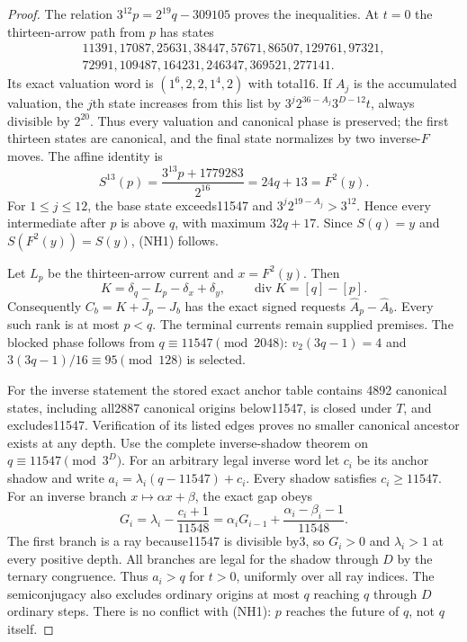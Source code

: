 \documentclass[11pt]{article}
\begin{document}
\begin{proof}
The relation $3^{12}p=2^{19}q-309105$ proves the inequalities.
At $t=0$ the thirteen-arrow path from $p$ has states
\[
\begin{gathered}
11391,17087,25631,38447,57671,86507,129761,97321,\\
72991,109487,164231,246347,369521,277141.
\end{gathered}
\]
Its exact valuation word is $(1^6,2,2,1^4,2)$ with total16.
If $A_j$ is the accumulated valuation, the $j$th state increases
from this list by $3^j2^{36-A_j}3^{D-12}t$, always divisible by
$2^{20}$. Thus every valuation and canonical phase is preserved;
the first thirteen states are canonical, and the final state
normalizes by two inverse-$F$ moves. The affine identity is
\[
 S^{13}(p)=\frac{3^{13}p+1779283}{2^{16}}
 =24q+13=F^2(y).
\]
For $1\le j\le12$, the base state exceeds11547 and
$3^j2^{19-A_j}>3^{12}$. Hence every intermediate after $p$
is above $q$, with maximum $32q+17$. Since $S(q)=y$ and
$S(F^2(y))=S(y)$, (NH1) follows.

Let $L_p$ be the thirteen-arrow current and $x=F^2(y)$.
Then
\[
 K=\delta_q-L_p-\delta_x+\delta_y,
 \qquad\operatorname{div}K=[q]-[p].
\]
Consequently $C_b=K+\widehat J_p-\widehat J_b$ has the exact
signed requests $\widehat A_p-\widehat A_b$. Every such rank
is at most $p<q$. The terminal currents remain supplied premises.
The blocked phase follows from $q\equiv11547\pmod{2048}$:
$v_2(3q-1)=4$ and $3(3q-1)/16\equiv95\pmod{128}$ is selected.

For the inverse statement the stored exact anchor table contains
4892 canonical states, including all2887 canonical origins below11547,
is closed under $T$, and excludes11547. Verification of its listed
edges proves no smaller canonical ancestor exists at any depth.
Use the complete inverse-shadow theorem on $q\equiv11547\pmod{3^D}$.
For an arbitrary legal inverse word let $c_i$ be its anchor shadow
and write $a_i=\lambda_i(q-11547)+c_i$. Every shadow satisfies
$c_i\ge11547$. For an inverse branch $x\mapsto\alpha x+\beta$,
the exact gap obeys
\[
 G_i=\lambda_i-\frac{c_i+1}{11548}
 =\alpha_iG_{i-1}+\frac{\alpha_i-\beta_i-1}{11548}.
\]
The first branch is a ray because11547 is divisible by3, so
$G_i>0$ and $\lambda_i>1$ at every positive depth. All branches
are legal for the shadow through $D$ by the ternary congruence.
Thus $a_i>q$ for $t>0$, uniformly over all ray indices.
The semiconjugacy also excludes ordinary origins at most $q$
reaching $q$ through $D$ ordinary steps. There is no conflict
with (NH1): $p$ reaches the future of $q$, not $q$ itself.
\end{proof}
\end{document}
